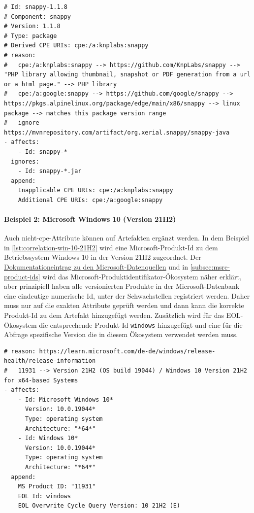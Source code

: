 \begin{lstlisting}[style=yaml,caption={Korrelationseintrag für Snappy-Komponenten},label={lst:correlation-snappy}]
# Id: snappy-1.1.8
# Component: snappy
# Version: 1.1.8
# Type: package
# Derived CPE URIs: cpe:/a:knplabs:snappy
# reason:
#   cpe:/a:knplabs:snappy --> https://github.com/KnpLabs/snappy --> "PHP library allowing thumbnail, snapshot or PDF generation from a url or a html page." --> PHP library
#   cpe:/a:google:snappy --> https://github.com/google/snappy --> https://pkgs.alpinelinux.org/package/edge/main/x86/snappy --> linux package --> matches this package version range
#   ignore https://mvnrepository.com/artifact/org.xerial.snappy/snappy-java
- affects:
    - Id: snappy-*
  ignores:
    - Id: snappy-*.jar
  append:
    Inapplicable CPE URIs: cpe:/a:knplabs:snappy
    Additional CPE URIs: cpe:/a:google:snappy
\end{lstlisting}

\paragraph{Beispiel 2: Microsoft Windows 10 (Version 21H2)}
Auch nicht-\acrshort{cpe}-Attribute können auf Artefakten ergänzt werden.
In dem Beispiel in \autoref{lst:correlation-win-10-21H2} wird eine Microsoft-Produkt-Id zu dem Betriebssystem Windows 10 in der Version 21H2 zugeordnet.
Der \href{https://github.com/org-metaeffekt/metaeffekt-documentation/blob/bd184b2889d5421b5a71dcd26c1ac0ffc63d07e7/metaeffekt-vulnerability-management/data-mirror/msrc/understanding-data.md}{Dokumentationeintrag zu den Microsoft-Datenquellen} und in \autoref{subsec:msrc-product-ids} wird das Microsoft-Produktidentifikator-Ökosystem näher erklärt, aber prinzipiell haben alle versionierten Produkte in der Microsoft-Datenbank eine eindeutige numerische Id, unter der Schwachstellen registriert werden.
Daher muss nur auf die exakten Attribute geprüft werden und dann kann die korrekte Produkt-Id zu dem Artefakt hinzugefügt werden.
Zusätzlich wird für das EOL-Ökosystem die entsprechende Produkt-Id \texttt{windows} hinzugefügt und eine für die Abfrage spezifische Version die in diesem Ökosystem verwendet werden muss.

\begin{lstlisting}[style=yaml,caption={Korrelationseintrag für Windows 10},label={lst:correlation-win-10-21H2}]
# reason: https://learn.microsoft.com/de-de/windows/release-health/release-information
#   11931 --> Version 21H2 (OS build 19044) / Windows 10 Version 21H2 for x64-based Systems
- affects:
    - Id: Microsoft Windows 10*
      Version: 10.0.19044*
      Type: operating system
      Architecture: "*64*"
    - Id: Windows 10*
      Version: 10.0.19044*
      Type: operating system
      Architecture: "*64*"
  append:
    MS Product ID: "11931"
    EOL Id: windows
    EOL Overwrite Cycle Query Version: 10 21H2 (E)
\end{lstlisting}

